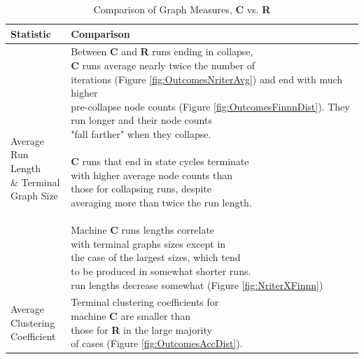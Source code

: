 \documentclass{tufte-handout}
\begin{document}
{\clearpage

\begin{table}
\centering
\caption{Comparison of Graph Measures, \textbf{C} vs. \textbf{R}}
\begin{tabular}{ll}\toprule
\addlinespace[3mm]
Statistic  & Comparison \\ \midrule
\addlinespace[2mm]

\makecell[tl]{
Average \\%
Run Length \\%
\& Terminal \\%
Graph Size} &
\makecell[tl]{
Between \textbf{C} and \textbf{R} runs ending in collapse, \\%
\textbf{C} runs average nearly twice the number of \\%
iterations (Figure \ref{fig:OutcomesNriterAvg}) and end with much higher \\%
pre-collapse node counts (Figure \ref{fig:OutcomesFinnnDist}). They \\%
run longer and their node counts \\%
"fall farther" when they collapse. \\%
\\%
\textbf{C} runs that end in state cycles terminate \\%
with higher average node counts than \\%
those for collapsing runs, despite \\%
averaging more than twice the run length. \\%
\\%
Machine \textbf{C} runs lengths correlate \\%
with terminal graphs sizes except in \\%
the case of the largest sizes, which tend \\%
to be produced in somewhat shorter runs. \\%
run lengths decrease somewhat (Figure \ref{fig:NriterXFinnn})} \\

\vspace{2mm}
\makecell[tl]{
Average \\%
Clustering \\%
Coefficient} &
\makecell[tl]{
Terminal clustering coefficients for \\%
machine \textbf{C} are smaller than \\%
those for \textbf{R} in the large majority \\%
of cases (Figure \ref{fig:OutcomesAccDist}).} \\


\end{tabular}
\end{table}}
\end{document}
